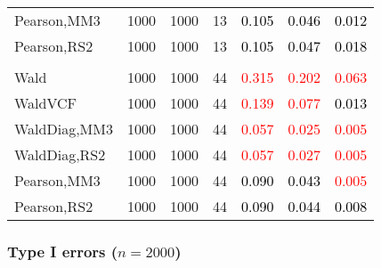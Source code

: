 \documentclass[
]{article}
\begin{document}
\begin{table}[H]
{\begin{tabular}[t]{lrrrrrr}
\hspace{1em}Pearson,MM3 & 1000 & 1000 & 13 & \textcolor{black}{0.105} & \textcolor{black}{0.046} & \textcolor{black}{0.012}\\
\hspace{1em}Pearson,RS2 & 1000 & 1000 & 13 & \textcolor{black}{0.105} & \textcolor{black}{0.047} & \textcolor{black}{0.018}\\
\addlinespace[0.3em]
\multicolumn{7}{l}{\textbf{3F 15V}}\\
\hspace{1em}Wald & 1000 & 1000 & 44 & \textcolor{red}{0.315} & \textcolor{red}{0.202} & \textcolor{red}{0.063}\\
\hspace{1em}WaldVCF & 1000 & 1000 & 44 & \textcolor{red}{0.139} & \textcolor{red}{0.077} & \textcolor{black}{0.013}\\
\hspace{1em}WaldDiag,MM3 & 1000 & 1000 & 44 & \textcolor{red}{0.057} & \textcolor{red}{0.025} & \textcolor{red}{0.005}\\
\hspace{1em}WaldDiag,RS2 & 1000 & 1000 & 44 & \textcolor{red}{0.057} & \textcolor{red}{0.027} & \textcolor{red}{0.005}\\
\hspace{1em}Pearson,MM3 & 1000 & 1000 & 44 & \textcolor{black}{0.090} & \textcolor{black}{0.043} & \textcolor{red}{0.005}\\
\hspace{1em}Pearson,RS2 & 1000 & 1000 & 44 & \textcolor{black}{0.090} & \textcolor{black}{0.044} & \textcolor{black}{0.008}\\
\bottomrule
\end{tabular}}
\endgroup{}
\end{table}

\hypertarget{type-i-errors-n2000-2}{%
\subsubsection{\texorpdfstring{Type I errors
(\(n=2000\))}{Type I errors (n=2000)}}\label{type-i-errors-n2000-2}}
\end{document}
